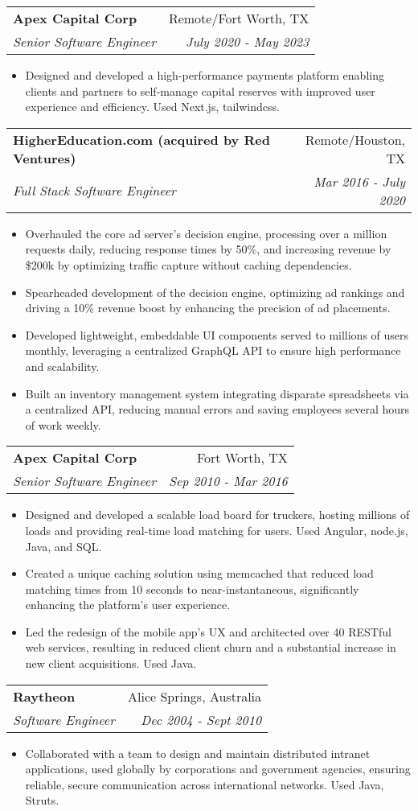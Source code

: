 \documentclass[letterpaper,11pt]{article}
\makeatletter
\newcommand{\resumeItem}[1]{
    \item\small{
      {#1 \vspace{-2pt}}
    }
  }
\newcommand{\resumeSubheading}[4]{
    \vspace{-1pt}\item
      \begin{tabular*}{0.97\textwidth}{l@{\extracolsep{\fill}}r}
        \textbf{#1} & #2 \\
        \textit{\small#3} & \textit{\small #4} \\
      \end{tabular*}\vspace{-5pt}
  }
\newcommand{\resumeItemListStart}{\begin{itemize}}
\newcommand{\resumeItemListEnd}{\end{itemize}\vspace{-5pt}}
\makeatother
\begin{document}
    \resumeSubheading
        {Apex Capital Corp}{Remote/Fort Worth, TX}
        {Senior Software Engineer}{July 2020 - May 2023}
        \resumeItemListStart
          \resumeItem
            {Designed and developed a high-performance payments platform enabling clients and partners to self-manage capital reserves with improved user experience and efficiency. Used Next.js, tailwindcss.}
        \resumeItemListEnd

      \resumeSubheading
        {HigherEducation.com (acquired by Red Ventures)}{Remote/Houston, TX}
        {Full Stack Software Engineer}{Mar 2016 - July 2020}
        \resumeItemListStart
          \resumeItem
            {Overhauled the core ad server's decision engine, processing over a million requests daily, reducing response times by 50\%, and increasing revenue by \$200k by optimizing traffic capture without caching dependencies.}
          \resumeItem
            {Spearheaded development of the decision engine, optimizing ad rankings and driving a 10\% revenue boost by enhancing the precision of ad placements.}
          \resumeItem
            {Developed lightweight, embeddable UI components served to millions of users monthly, leveraging a centralized GraphQL API to ensure high performance and scalability.}
          \resumeItem
            {Built an inventory management system integrating disparate spreadsheets via a centralized API, reducing manual errors and saving employees several hours of work weekly.}
        \resumeItemListEnd

      \resumeSubheading
        {Apex Capital Corp}{Fort Worth, TX}
        {Senior Software Engineer}{Sep 2010 - Mar 2016}
        \resumeItemListStart
          \resumeItem
            {Designed and developed a scalable load board for truckers, hosting millions of loads and providing real-time load matching for users. Used Angular, node.js, Java, and SQL.}
          \resumeItem
            {Created a unique caching solution using memcached that reduced load matching times from 10 seconds to near-instantaneous, significantly enhancing the platform's user experience.}
          \resumeItem
            {Led the redesign of the mobile app’s UX and architected over 40 RESTful web services, resulting in reduced client churn and a substantial increase in new client acquisitions. Used Java.}
        \resumeItemListEnd

      \resumeSubheading
        {Raytheon}{Alice Springs, Australia}
        {Software Engineer}{Dec 2004 - Sept 2010}
        \resumeItemListStart
          \resumeItem
            {Collaborated with a team to design and maintain distributed intranet applications, used globally by corporations and government agencies, ensuring reliable, secure communication across international networks. Used Java, Struts.}
        \resumeItemListEnd
\end{document}

